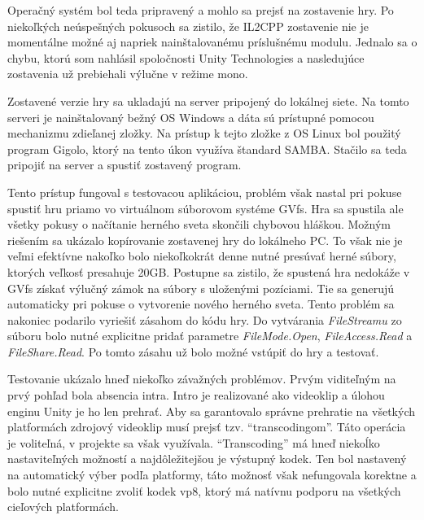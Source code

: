 \documentclass[slovak, bachelorpractice]{diploma}
\begin{document}
Operačný systém bol teda pripravený a mohlo sa prejsť na zostavenie hry. Po niekoľkých neúspešných pokusoch sa zistilo, že IL2CPP zostavenie nie je momentálne možné aj napriek nainštalovanému príslušnému modulu. Jednalo sa o chybu, ktorú som nahlásil spoločnosti Unity Technologies a nasledujúce zostavenia už prebiehali výlučne v režime mono. 

Zostavené verzie hry sa ukladajú na server pripojený do lokálnej siete. Na tomto serveri je nainštalovaný bežný OS Windows a dáta sú prístupné pomocou mechanizmu zdieľanej zložky. Na prístup k tejto zložke z OS Linux bol použitý program Gigolo, ktorý na tento úkon využíva štandard SAMBA. Stačilo sa teda pripojiť na server a spustiť zostavený program.

Tento prístup fungoval s testovacou aplikáciou, problém však nastal pri pokuse spustiť hru priamo vo virtuálnom súborovom systéme GVfs. Hra sa spustila ale všetky pokusy o načítanie herného sveta skončili chybovou hláškou. Možným riešením sa ukázalo kopírovanie zostavenej hry do lokálneho PC. To však nie je veľmi efektívne nakoľko bolo niekoľkokrát denne nutné presúvať herné súbory, ktorých veľkosť presahuje 20GB. Postupne sa zistilo, že spustená hra nedokáže v GVfs získať výlučný zámok na súbory s uloženými pozíciami. Tie sa generujú automaticky pri pokuse o vytvorenie nového herného sveta. Tento problém sa nakoniec podarilo vyriešiť zásahom do kódu hry. Do vytvárania \textit{FileStreamu} zo súboru bolo nutné explicitne pridať parametre \textit{FileMode.Open}, \textit{FileAccess.Read} a \textit{FileShare.Read}. Po tomto zásahu už bolo možné vstúpiť do hry a testovať.

Testovanie ukázalo hneď niekoľko závažných problémov. Prvým viditeľným na prvý pohľad bola absencia intra. Intro je realizované ako videoklip a úlohou enginu Unity je ho len prehrať. Aby sa garantovalo správne prehratie na všetkých platformách zdrojový videoklip musí prejsť tzv. \enquote{transcodingom}. Táto operácia je voliteľná, v projekte sa však využívala. \enquote{Transcoding} má hneď niekoĺko nastaviteľných možností a najdôležitejšou je výstupný kodek. Ten bol nastavený na automatický výber podľa platformy, táto možnosť však nefungovala korektne a bolo nutné explicitne zvoliť kodek vp8, ktorý má natívnu podporu na všetkých cieľových platformách.
\end{document}
